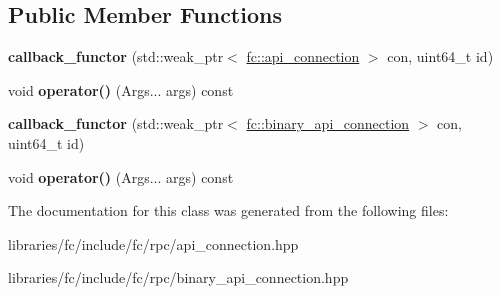 \subsection*{Public Member Functions}
\begin{DoxyCompactItemize}
\item 
\mbox{\label{classfc_1_1detail_1_1callback__functor_3_01void_07_args_8_8_8_08_4_a1efc9675261132f25c81b254a6ec6963}} 
{\bfseries callback\+\_\+functor} (std\+::weak\+\_\+ptr$<$ \mbox{\hyperlink{classfc_1_1api__connection}{fc\+::api\+\_\+connection}} $>$ con, uint64\+\_\+t id)
\item 
\mbox{\label{classfc_1_1detail_1_1callback__functor_3_01void_07_args_8_8_8_08_4_ad7f8a981067e3dde292d5d3e3dd802ae}} 
void {\bfseries operator()} (Args... args) const
\item 
\mbox{\label{classfc_1_1detail_1_1callback__functor_3_01void_07_args_8_8_8_08_4_a1f79792aac16827fca5c8d65a9797234}} 
{\bfseries callback\+\_\+functor} (std\+::weak\+\_\+ptr$<$ \mbox{\hyperlink{classfc_1_1binary__api__connection}{fc\+::binary\+\_\+api\+\_\+connection}} $>$ con, uint64\+\_\+t id)
\item 
\mbox{\label{classfc_1_1detail_1_1callback__functor_3_01void_07_args_8_8_8_08_4_ad7f8a981067e3dde292d5d3e3dd802ae}} 
void {\bfseries operator()} (Args... args) const
\end{DoxyCompactItemize}


The documentation for this class was generated from the following files\+:\begin{DoxyCompactItemize}
\item 
libraries/fc/include/fc/rpc/api\+\_\+connection.\+hpp\item 
libraries/fc/include/fc/rpc/binary\+\_\+api\+\_\+connection.\+hpp\end{DoxyCompactItemize}
